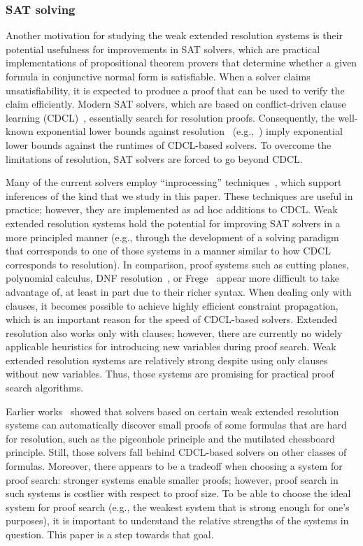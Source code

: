 \documentclass[10pt,a4paper]{article}
\begin{document}
\subsubsection{SAT solving}
\label{sec:SAT-solving}

Another motivation for studying the weak extended resolution systems
is their potential usefulness for improvements in SAT solvers,
which are practical implementations of propositional theorem provers
that determine whether a given formula in conjunctive normal form is satisfiable.
When a solver claims unsatisfiability, it is expected to produce a proof
that can be used to verify the claim efficiently.
Modern SAT solvers, which are based on
conflict-driven clause learning (CDCL)~\cite{MS99},
essentially search for resolution proofs.
Consequently, the well-known exponential lower bounds against resolution~%
(e.g.,~\cite{Hak85,Urq87}) imply exponential lower bounds against
the runtimes of CDCL-based solvers.
To overcome the limitations of resolution,
SAT solvers are forced to go beyond CDCL\@.

Many of the current solvers employ ``inprocessing'' techniques~\cite{JHB12},
which support inferences of the kind that we study in this paper.
These techniques are useful in practice;
however, they are implemented as ad hoc additions to CDCL\@.
Weak extended resolution systems hold the potential
for improving SAT solvers in a more principled manner
(e.g., through the development of a solving paradigm
that corresponds to one of those systems
in a manner similar to how CDCL corresponds to resolution).
In comparison, proof systems such as cutting planes, polynomial calculus,
DNF resolution~\cite{Kra01}, or Frege~\cite{CR79}
appear more difficult to take advantage of,
at least in part due to their richer syntax.
When dealing only with clauses, it becomes possible to
achieve highly efficient constraint propagation,
which is an important reason for the speed of CDCL-based solvers.
Extended resolution also works only with clauses;
however, there are currently no widely applicable heuristics
for introducing new variables during proof search.
Weak extended resolution systems are relatively strong
despite using only clauses without new variables.
Thus, those systems are promising for practical proof search algorithms.

Earlier works~\cite{HKSB17,HKB19} showed that solvers based on
certain weak extended resolution systems can automatically discover
small proofs of some formulas that are hard for resolution,
such as the pigeonhole principle and the mutilated chessboard principle.
Still, those solvers fall behind CDCL-based solvers on other classes of formulas.
Moreover, there appears to be a tradeoff when choosing a system for proof search:
stronger systems enable smaller proofs;
however, proof search in such systems is costlier with respect to proof size.
To be able to choose the ideal system for proof search
(e.g., the weakest system that is strong enough for one's purposes),
it is important to understand the relative strengths of the systems in question.
This paper is a step towards that goal.
\end{document}
